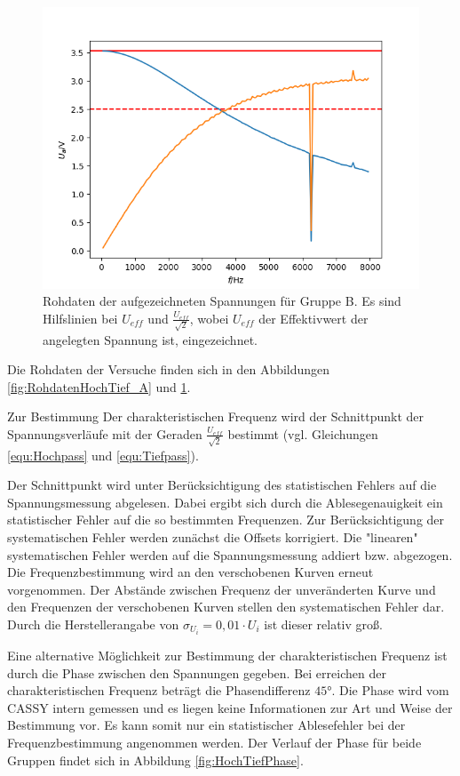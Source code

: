 \documentclass[12pt,a4paper]{article}
\begin{document}
\begin{figure}
\centering
\includegraphics[scale=1.0]{Bilder/RohdatenHochTief_B.png}
\caption{Rohdaten der aufgezeichneten Spannungen für Gruppe B. Es sind Hilfslinien bei $U_{eff}$ und $\frac{U_{eff}}{\sqrt{2}}$, wobei $U_{eff}$ der Effektivwert der angelegten Spannung ist, eingezeichnet.}
\label{fig:RohdatenHochTief_B}
\end{figure}

Die Rohdaten der Versuche finden sich in den Abbildungen \ref{fig:RohdatenHochTief_A} und \ref{fig:RohdatenHochTief_B}.

Zur Bestimmung Der charakteristischen Frequenz wird der Schnittpunkt der Spannungsverläufe mit der Geraden $\frac{U_{eff}}{\sqrt{2}}$ bestimmt (vgl. Gleichungen \ref{equ:Hochpass} und \ref{equ:Tiefpass}).

Der Schnittpunkt wird unter Berücksichtigung des statistischen Fehlers auf die Spannungsmessung abgelesen. Dabei ergibt sich durch die Ablesegenauigkeit ein statistischer Fehler auf die so bestimmten Frequenzen.
Zur Berücksichtigung der systematischen Fehler werden zunächst die Offsets korrigiert. Die "linearen" systematischen Fehler werden auf die Spannungsmessung addiert bzw. abgezogen. 
Die Frequenzbestimmung wird an den verschobenen Kurven erneut vorgenommen. Der Abstände zwischen Frequenz der unveränderten Kurve und den Frequenzen der verschobenen Kurven stellen den systematischen Fehler dar. Durch die Herstellerangabe von $\sigma_{U_i} = 0,01 \cdot U_i$ ist dieser relativ groß.

Eine alternative Möglichkeit zur Bestimmung der charakteristischen Frequenz ist durch die Phase zwischen den Spannungen gegeben. Bei erreichen der charakteristischen Frequenz beträgt die Phasendifferenz $\ang{45}$. Die Phase wird vom CASSY intern gemessen und es liegen keine Informationen zur Art und Weise der Bestimmung vor. Es kann somit nur ein statistischer Ablesefehler bei der Frequenzbestimmung angenommen werden. Der Verlauf der Phase für beide Gruppen findet sich in Abbildung \ref{fig:HochTiefPhase}.
\end{document}
